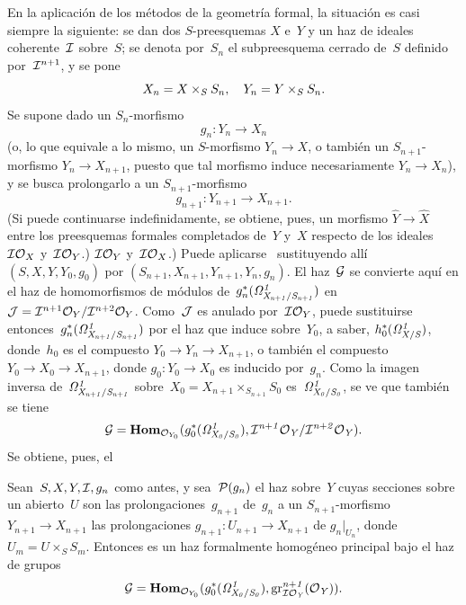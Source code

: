 
En la aplicación de los métodos de la geometría formal, la situación es casi siempre la siguiente: se dan dos $S$-preesquemas $X$ e~$Y$ y un haz de ideales coherente~$\cal{I}$ sobre~$S$; se denota por~$S_n$ el subpreesquema cerrado de~$S$ definido por~$\cal{I}^{n+1}$, y se pone
\begin{equation*}
X_n=X\times_S S_n\quoi,\quad Y_n=Y\times_S S_n.
\end{equation*}
Se supone dado un $S_n$-morfismo
\begin{equation*}
g_n\colon Y_n\to X_n
\end{equation*}
(o, lo que equivale a lo mismo, un $S$-morfismo $Y_n\to X$, o también un $S_{n+1}$-morfismo $Y_n\to X_{n+1}$, puesto que tal morfismo induce necesariamente $Y_n\to X_n$), y se busca prolongarlo a un $S_{n+1}$-morfismo
\begin{equation*}
g_{n+1}\colon Y_{n+1}\to X_{n+1}.
\end{equation*}
(Si puede continuarse indefinidamente, se obtiene, pues, un morfismo $\widehat{Y}\to\widehat{X}$ entre los preesquemas formales completados de~$Y$ y~$X$ respecto de los ideales
{$\cal{IO}_X$ y~$\cal{IO}_Y$.)}
{$\cal{IO}_Y$ y~$\cal{IO}_X$.)}
Puede aplicarse~ sustituyendo allí $(S,X,Y,Y_0,g_0)$ por $(S_{n+1},X_{n+1},Y_{n+1},Y_n,g_n)$. El haz~$\cal{G}$ se convierte aquí en el haz de homomorfismos de módulos de~$g_n^*(\it{\Omega}_{X_{n+1}/S_{n+1}}^1)$ en~$\cal{J}=\cal{I}^{n+1}\cal{O}_Y/\cal{I}^{n+2}\cal{O}_Y$. Como~$\cal{J}$ es anulado por~$\cal{IO}_Y$, puede sustituirse entonces~$g_n^*(\it{\Omega}_{X_{n+1}/S_{n+1}}^1)$
por el haz que induce sobre~$Y_0$, a saber, $h_0^*(\it{\Omega}_{X/S}^1)$, donde~$h_0$ es el compuesto $Y_0\to Y_n\to X_{n+1}$, o también el compuesto $Y_0\to X_0\to X_{n+1}$, donde $g_0\colon Y_0\to X_0$ es inducido por~$g_n$. Como la imagen inversa de~$\it{\Omega}_{X_{n+1}/S_{n+1}}^1$ sobre~$X_0=X_{n+1}\times_{S_{n+1}}S_0$ es~$\it{\Omega}_{X_0/S_0}^1$, se ve que también se tiene
\begin{equation*}
\cal{G}=\SheafHom_{\cal{O}_{Y_0}}
(g_0^*(\it{\Omega}_{X_0/S_0}^1),
\cal{I}^{n+1}\cal{O}_Y/\cal{I}^{n+2}\cal{O}_Y).
\end{equation*}
Se obtiene, pues, el

\begin{corollaire}
\label{III.5.3}
Sean~$S,X,Y,\cal{I},g_n$ como antes, y sea~$\cal{P}(g_n)$ el haz sobre~$Y$ cuyas secciones sobre un abierto~$U$ son
{las prolongaciones~$g_{n+1}$ de~$g_n$ a un $S_{n+1}$-morfismo $Y_{n+1}\to X_{n+1}$}
{las prolongaciones $g_{n+1}\colon U_{n+1}\to X_{n+1}$ de $g_n|_{U_n}$, donde $U_m=U\times_S S_m$}.
Entonces
es un haz formalmente homogéneo principal bajo el haz de grupos
\begin{equation*}
\cal{G}=\SheafHom_{\cal{O}_{Y_0}}
(g_0^*(\it{\Omega}_{X_0/S_0}^1),
\gr_{\cal{IO}_Y}^{n+1}(\cal{O}_Y)).
\end{equation*}
\end{corollaire}


